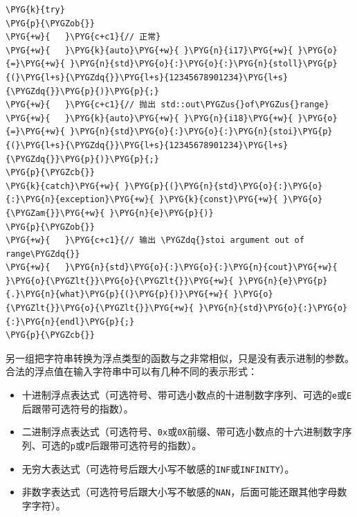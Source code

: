 \begin{itemize}
\begin{codeblockbg}
\begin{Verbatim}[commandchars=\\\{\},breaklines=true,breakanywhere=true,fontsize=\codefont,xleftmargin=17bp]
\PYG{k}{try}
\PYG{p}{\PYGZob{}}
\PYG{+w}{   }\PYG{c+c1}{// 正常}
\PYG{+w}{   }\PYG{k}{auto}\PYG{+w}{ }\PYG{n}{i17}\PYG{+w}{ }\PYG{o}{=}\PYG{+w}{ }\PYG{n}{std}\PYG{o}{:}\PYG{o}{:}\PYG{n}{stoll}\PYG{p}{(}\PYG{l+s}{\PYGZdq{}}\PYG{l+s}{12345678901234}\PYG{l+s}{\PYGZdq{}}\PYG{p}{)}\PYG{p}{;}
\PYG{+w}{   }\PYG{c+c1}{// 抛出 std::out\PYGZus{}of\PYGZus{}range}
\PYG{+w}{   }\PYG{k}{auto}\PYG{+w}{ }\PYG{n}{i18}\PYG{+w}{ }\PYG{o}{=}\PYG{+w}{ }\PYG{n}{std}\PYG{o}{:}\PYG{o}{:}\PYG{n}{stoi}\PYG{p}{(}\PYG{l+s}{\PYGZdq{}}\PYG{l+s}{12345678901234}\PYG{l+s}{\PYGZdq{}}\PYG{p}{)}\PYG{p}{;}
\PYG{p}{\PYGZcb{}}
\PYG{k}{catch}\PYG{+w}{ }\PYG{p}{(}\PYG{n}{std}\PYG{o}{:}\PYG{o}{:}\PYG{n}{exception}\PYG{+w}{ }\PYG{k}{const}\PYG{+w}{ }\PYG{o}{\PYGZam{}}\PYG{+w}{ }\PYG{n}{e}\PYG{p}{)}
\PYG{p}{\PYGZob{}}
\PYG{+w}{   }\PYG{c+c1}{// 输出 \PYGZdq{}stoi argument out of range\PYGZdq{}}
\PYG{+w}{   }\PYG{n}{std}\PYG{o}{:}\PYG{o}{:}\PYG{n}{cout}\PYG{+w}{ }\PYG{o}{\PYGZlt{}}\PYG{o}{\PYGZlt{}}\PYG{+w}{ }\PYG{n}{e}\PYG{p}{.}\PYG{n}{what}\PYG{p}{(}\PYG{p}{)}\PYG{+w}{ }\PYG{o}{\PYGZlt{}}\PYG{o}{\PYGZlt{}}\PYG{+w}{ }\PYG{n}{std}\PYG{o}{:}\PYG{o}{:}\PYG{n}{endl}\PYG{p}{;}
\PYG{p}{\PYGZcb{}}
\end{Verbatim}
\end{codeblockbg}

\end{itemize}



另一组把字符串转换为浮点类型的函数与之非常相似，只是没有表示进制的参数。合法的浮点值在输入字符串中可以有几种不同的表示形式：



\begin{itemize}
\item 十进制浮点表达式（可选符号、带可选小数点的十进制数字序列、可选的\texttt{e}或\texttt{E}后跟带可选符号的指数）。



\item 二进制浮点表达式（可选符号、\texttt{0x}或\texttt{0X}前缀、带可选小数点的十六进制数字序列、可选的\texttt{p}或\texttt{P}后跟带可选符号的指数）。



\item 无穷大表达式（可选符号后跟大小写不敏感的\texttt{INF}或\texttt{INFINITY}）。



\item 非数字表达式（可选符号后跟大小写不敏感的\texttt{NAN}，后面可能还跟其他字母数字字符）。

\end{itemize}


